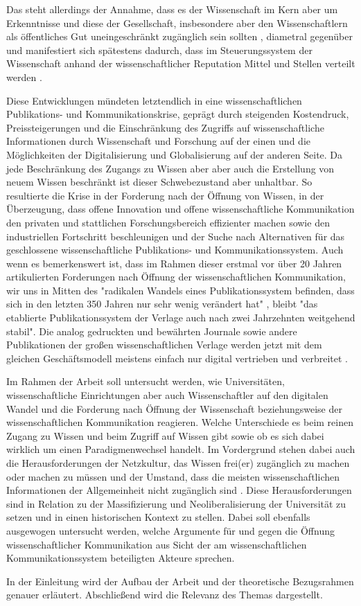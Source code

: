 Das steht allerdings der Annahme, dass es der Wissenschaft im Kern aber um Erkenntnisse und diese der Gesellschaft, insbesondere aber den Wissenschaftlern als öffentliches Gut uneingeschränkt zugänglich sein sollten \cite{hanekop_2006}, diametral gegenüber \cite{offhaus_2012_institutionelle_repos} und manifestiert sich spätestens dadurch, dass im Steuerungssystem der Wissenschaft anhand der wissenschaftlicher Reputation Mittel und Stellen verteilt werden \cite{cite:4}.

Diese Entwicklungen mündeten letztendlich in eine wissenschaftlichen Publikations- und Kommunikationskrise, geprägt durch steigenden Kostendruck, Preissteigerungen und die Einschränkung des Zugriffs auf wissenschaftliche Informationen durch Wissenschaft und Forschung auf der einen und die Möglichkeiten der Digitalisierung und Globalisierung auf der anderen Seite. Da jede Beschränkung des Zugangs zu Wissen aber aber auch die Erstellung von neuem Wissen beschränkt \cite{cite:5} \cite{cite:8} ist dieser Schwebezustand aber unhaltbar. So resultierte die Krise in der Forderung nach der Öffnung von Wissen, in der Überzeugung, dass offene Innovation und offene wissenschaftliche Kommunikation den privaten und stattlichen Forschungsbereich effizienter machen sowie den industriellen Fortschritt beschleunigen \cite{cite:7} und der Suche nach Alternativen für das geschlossene wissenschaftliche Publikations- und Kommunikationssystem. Auch wenn es bemerkenswert ist, dass im Rahmen dieser erstmal vor über 20 Jahren artikulierten Forderungen nach Öffnung der wissenschaftlichen Kommunikation, wir uns in Mitten des "radikalen Wandels eines Publikationssystem befinden, dass sich in den letzten 350 Jahren nur sehr wenig verändert hat" \cite{poynder_2011_suber}, bleibt "das etablierte Publikationssystem der Verlage auch nach zwei Jahrzehnten weitgehend stabil"\cite{Hanekop_2014}. Die analog gedruckten und bewährten Journale sowie andere Publikationen der großen wissenschaftlichen Verlage werden jetzt mit dem gleichen Geschäftsmodell meistens einfach nur digital vertrieben und verbreitet \cite{Hanekop_2014} \cite{boai_2012}.

Im Rahmen der Arbeit soll untersucht werden, wie Universitäten, wissenschaftliche Einrichtungen aber auch Wissenschaftler auf den digitalen Wandel und die Forderung nach Öffnung der Wissenschaft beziehungsweise der wissenschaftlichen Kommunikation reagieren. Welche Unterschiede es beim reinen Zugang zu Wissen und beim Zugriff auf Wissen gibt sowie ob es sich dabei wirklich um einen Paradigmenwechsel handelt. Im Vordergrund stehen dabei auch die Herausforderungen der Netzkultur, das Wissen frei(er) zugänglich zu machen oder machen zu müssen und der Umstand, dass die meisten wissenschaftlichen Informationen der Allgemeinheit nicht zugänglich sind \cite{cite:6}. Diese Herausforderungen sind in Relation zu der Massifizierung und Neoliberalisierung der Universität zu setzen und in einen historischen Kontext zu stellen. Dabei soll ebenfalls ausgewogen untersucht werden, welche Argumente für und gegen die Öffnung wissenschaftlicher Kommunikation aus Sicht der am wissenschaftlichen Kommunikationssystem beteiligten Akteure sprechen.

In der Einleitung wird der Aufbau der Arbeit und der theoretische Bezugsrahmen genauer erläutert. Abschließend wird die Relevanz des Themas dargestellt.